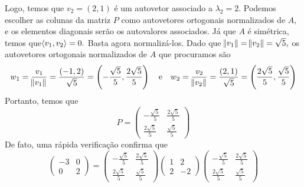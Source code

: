 \documentclass[11pt,a4paper]{article}
\begin{document}
{{Logo, temos que $v_2 = (2,1)$ é um autovetor associado a $\lambda_2 = 2.$ 
Podemos escolher as colunas da matriz $P$ como autovetores ortogonais normalizados de $A,$ e os elementos diagonais serão os autovalores associados.
Já que $A$ é simétrica, temos que$\left\langle v_1, v_2 \right\rangle = 0.$ Basta agora normalizá-los. Dado que $\norm{v_1} = \norm{v_2} = \sqrt{5},$ os autovetores ortogonais normalizados de $A$ que procuramos são
\[
w_1 = \frac{v_1}{\norm{v_1}} = \frac{(-1,2)}{\sqrt{5}} = \left(-\frac{\sqrt{5}}{5}, \frac{2 \sqrt{5}}{5} \right) \quad \mbox{e} \quad w_2 = \frac{v_2}{\norm{v_2}} = \frac{(2,1)}{\sqrt{5}} = \left(\frac{2\sqrt{5}}{5}, \frac{ \sqrt{5}}{5} \right) 
\]
Portanto, temos que
\[
P = \begin{pmatrix}
-\frac{\sqrt{5}}{5} & \frac{2\sqrt{5}}{5} \\
\frac{2 \sqrt{5}}{5} & \frac{\sqrt{5}}{5} 
\end{pmatrix}
\]
De fato, uma rápida verificação confirma que
\[
 \begin{pmatrix}
-3 & 0 \\
0 & 2
\end{pmatrix} = \begin{pmatrix}
-\frac{\sqrt{5}}{5} & \frac{2\sqrt{5}}{5} \\
\frac{2 \sqrt{5}}{5} & \frac{\sqrt{5}}{5} 
\end{pmatrix}
 \begin{pmatrix}
1 & 2 \\
2 & -2
\end{pmatrix}
\begin{pmatrix}
-\frac{\sqrt{5}}{5} & \frac{2\sqrt{5}}{5} \\
\frac{2 \sqrt{5}}{5} & \frac{\sqrt{5}}{5} 
\end{pmatrix}
\]

}}
\end{document}
